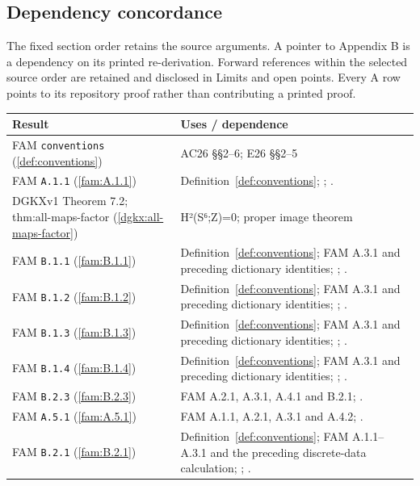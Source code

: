 \subsection{Dependency concordance}\label{app:dependencies}
The fixed section order retains the source arguments. A pointer to Appendix B is a dependency on its printed re-derivation. Forward references within the selected source order are retained and disclosed in Limits and open points. Every A row points to its repository proof rather than contributing a printed proof.
\begingroup\small\begin{longtable}{@{}L{.21\linewidth}L{.73\linewidth}@{}}
\toprule Result & Uses / dependence\\\midrule\endhead
FAM \nolinkurl{conventions} (\ref{def:conventions}) & AC26 §§2–6; E26 §§2–5\\
FAM \nolinkurl{A.1.1} (\ref{fam:A.1.1}) & Definition~\ref{def:conventions}; \cite[Theorem 7.1]{DGKXv1}; \cite[Theorem 9.1]{AC26}.\\
DGKXv1 Theorem 7.2; thm:\allowbreak{}all-maps-factor (\ref{dgkx:all-maps-factor}) & H²(S⁶;Z)=0; proper image theorem\\
FAM \nolinkurl{B.1.1} (\ref{fam:B.1.1}) & Definition~\ref{def:conventions}; FAM A.3.1 and preceding dictionary identities; \cite[Remark 3.12]{AC26}; \cite[Lemma 2.1; Corollary 2.2; Definition 2.3]{E26}.\\
FAM \nolinkurl{B.1.2} (\ref{fam:B.1.2}) & Definition~\ref{def:conventions}; FAM A.3.1 and preceding dictionary identities; \cite[Remark 3.12]{AC26}; \cite[Lemma 2.1; Corollary 2.2; Definition 2.3]{E26}.\\
FAM \nolinkurl{B.1.3} (\ref{fam:B.1.3}) & Definition~\ref{def:conventions}; FAM A.3.1 and preceding dictionary identities; \cite[Remark 3.12]{AC26}; \cite[Lemma 2.1; Corollary 2.2; Definition 2.3]{E26}.\\
FAM \nolinkurl{B.1.4} (\ref{fam:B.1.4}) & Definition~\ref{def:conventions}; FAM A.3.1 and preceding dictionary identities; \cite[Remark 3.12]{AC26}; \cite[Lemma 2.1; Corollary 2.2; Definition 2.3]{E26}.\\
FAM \nolinkurl{B.2.3} (\ref{fam:B.2.3}) & FAM A.2.1, A.3.1, A.4.1 and B.2.1; \cite[Remark 8.1]{E26}.\\
FAM \nolinkurl{A.5.1} (\ref{fam:A.5.1}) & FAM A.1.1, A.2.1, A.3.1 and A.4.2; \cite[Theorems 1.3, 1.4 and 7.1; punctured-disc corollary]{DGKXv1}.\\
FAM \nolinkurl{B.2.1} (\ref{fam:B.2.1}) & Definition~\ref{def:conventions}; FAM A.1.1--A.3.1 and the preceding discrete-data calculation; \cite[Section 6.4]{AC26}; \cite[Sections 3 and 5]{E26}.\\

\end{longtable}

